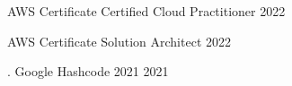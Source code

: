 



\begin{cvhonors}

  \cvhonor
    {AWS Certificate} %
    {Certified Cloud Practitioner} %
    {} %
    {2022} %

  \cvhonor
    {AWS Certificate} %
    {Solution Architect} %
    {} %
    {2022} %

  \cvhonor
    {.} %
    {Google Hashcode 2021} %
    {} %
    {2021} %




\end{cvhonors}





